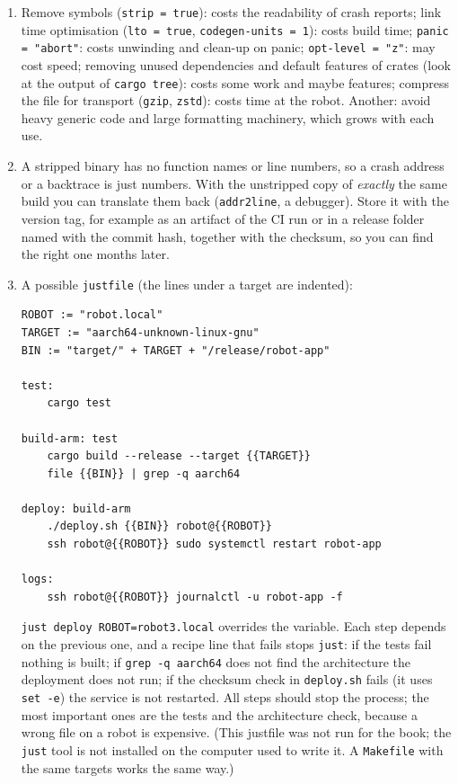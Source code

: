 \begin{enumerate}[label=\textbf{\ansnum.\arabic*}]
  \item Remove symbols (\verb!strip = true!): costs the readability of crash reports; link time optimisation (\verb!lto = true!, \verb!codegen-units = 1!): costs build time; \verb!panic = "abort"!: costs unwinding and clean-up on panic; \verb!opt-level = "z"!: may cost speed; removing unused dependencies and default features of crates (look at the output of \verb!cargo tree!): costs some work and maybe features; compress the file for transport (\verb!gzip!, \verb!zstd!): costs time at the robot. Another: avoid heavy generic code and large formatting machinery, which grows with each use.
  \item A stripped binary has no function names or line numbers, so a crash address or a backtrace is just numbers. With the unstripped copy of \emph{exactly} the same build you can translate them back (\verb!addr2line!, a debugger). Store it with the version tag, for example as an artifact of the CI run or in a release folder named with the commit hash, together with the checksum, so you can find the right one months later.
  \item[\textbf{\ansnum.10}$\star$] A possible \verb!justfile! (the lines under a target are indented):
\begin{verbatim}
ROBOT := "robot.local"
TARGET := "aarch64-unknown-linux-gnu"
BIN := "target/" + TARGET + "/release/robot-app"

test:
    cargo test

build-arm: test
    cargo build --release --target {{TARGET}}
    file {{BIN}} | grep -q aarch64

deploy: build-arm
    ./deploy.sh {{BIN}} robot@{{ROBOT}}
    ssh robot@{{ROBOT}} sudo systemctl restart robot-app

logs:
    ssh robot@{{ROBOT}} journalctl -u robot-app -f
\end{verbatim}
\verb!just deploy ROBOT=robot3.local! overrides the variable. Each step depends on the previous one, and a recipe line that fails stops \verb!just!: if the tests fail nothing is built; if \verb!grep -q aarch64! does not find the architecture the deployment does not run; if the checksum check in \verb!deploy.sh! fails (it uses \verb!set -e!) the service is not restarted. All steps should stop the process; the most important ones are the tests and the architecture check, because a wrong file on a robot is expensive. (This justfile was not run for the book; the \verb!just! tool is not installed on the computer used to write it. A \verb!Makefile! with the same targets works the same way.)
\end{enumerate}

